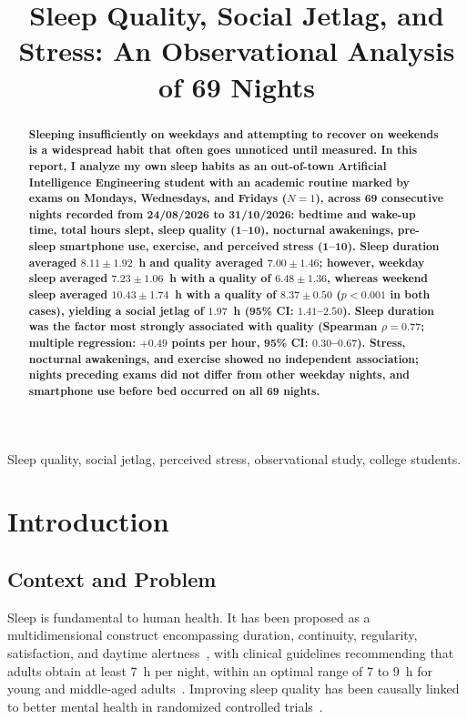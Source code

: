 \documentclass[conference]{IEEEtran}
\begin{document}
\title{Sleep Quality, Social Jetlag, and Stress: An Observational Analysis of 69 Nights}

\author{
}

\maketitle

\begin{abstract}
\textbf{Sleeping insufficiently on weekdays and attempting to recover on weekends is a widespread habit that often goes unnoticed until measured. In this report, I analyze my own sleep habits as an out-of-town Artificial Intelligence Engineering student with an academic routine marked by exams on Mondays, Wednesdays, and Fridays ($N=1$), across 69 consecutive nights recorded from 24/08/2026 to 31/10/2026: bedtime and wake-up time, total hours slept, sleep quality (1--10), nocturnal awakenings, pre-sleep smartphone use, exercise, and perceived stress (1--10). Sleep duration averaged $8.11\pm1.92$~h and quality averaged $7.00\pm1.46$; however, weekday sleep averaged $7.23\pm1.06$~h with a quality of $6.48\pm1.36$, whereas weekend sleep averaged $10.43\pm1.74$~h with a quality of $8.37\pm0.50$ ($p < 0.001$ in both cases), yielding a social jetlag of $1.97$~h (95\% CI: $1.41$--$2.50$). Sleep duration was the factor most strongly associated with quality (Spearman $\rho=0.77$; multiple regression: $+0.49$ points per hour, 95\% CI: $0.30$--$0.67$). Stress, nocturnal awakenings, and exercise showed no independent association; nights preceding exams did not differ from other weekday nights, and smartphone use before bed occurred on all 69 nights.}
\end{abstract}

\begin{IEEEkeywords}
Sleep quality, social jetlag, perceived stress, observational study, college students.
\end{IEEEkeywords}

\section{Introduction}

\subsection{Context and Problem}
Sleep is fundamental to human health. It has been proposed as a multidimensional construct encompassing duration, continuity, regularity, satisfaction, and daytime alertness~\cite{ref1}, with clinical guidelines recommending that adults obtain at least 7~h per night, within an optimal range of 7 to 9~h for young and middle-aged adults~\cite{ref2,ref3}. Improving sleep quality has been causally linked to better mental health in randomized controlled trials~\cite{ref4}.
\end{document}
